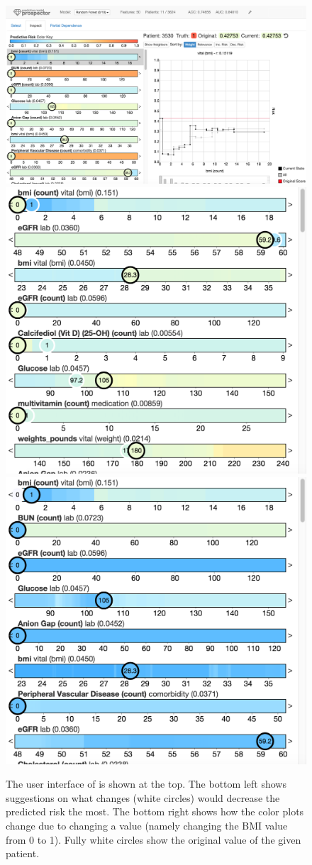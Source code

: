\begin{figure}
\centering
\includegraphics[width=0.8\linewidth]{prospector/ui_inspect} %
\\
\vspace*{0.75em} %
\includegraphics[width=0.3\linewidth]{prospector/ui_sugg} %
\hspace*{0.2\linewidth} %
\includegraphics[width=0.3\linewidth]{prospector/ui_change} %
\caption[The user interface of \prospector.]{
The user interface of \prospector is shown at the top.
The bottom left shows suggestions on what changes (white circles) would decrease the
predicted risk the most.
The bottom right shows how the color plots change due to changing a value (namely changing the
BMI value from 0 to 1).
Fully white circles show the original value of the given patient.
}
\label{figs:ui}
\end{figure}